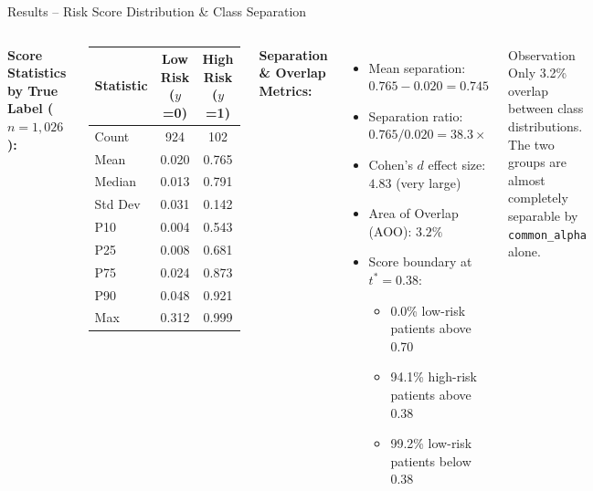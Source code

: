 \documentclass[aspectratio=169]{beamer}
\begin{document}
\begin{frame}{Results -- Risk Score Distribution \& Class Separation}
  \begin{columns}[T]
      \textbf{Score Statistics by True Label ($n=1{,}026$):}
      \begin{center}\small
      \begin{tabular}{@{}lcc@{}}
        \toprule
        \textbf{Statistic} & \textbf{Low Risk ($y$=0)}
                           & \textbf{High Risk ($y$=1)} \\
        \midrule
        Count      & 924  & 102 \\
        Mean       & 0.020 & 0.765 \\
        Median     & 0.013 & 0.791 \\
        Std Dev    & 0.031 & 0.142 \\
        P10        & 0.004 & 0.543 \\
        P25        & 0.008 & 0.681 \\
        P75        & 0.024 & 0.873 \\
        P90        & 0.048 & 0.921 \\
        Max        & 0.312 & 0.999 \\
        \bottomrule
      \end{tabular}
      \end{center}
      \textbf{Separation \& Overlap Metrics:}
      \begin{itemize}\small
        \item Mean separation: $0.765 - 0.020 = \mathbf{0.745}$
        \item Separation ratio: $0.765/0.020 = \mathbf{38.3\times}$
        \item Cohen's $d$ effect size: $\mathbf{4.83}$ (very large)
        \item Area of Overlap (AOO): $\mathbf{3.2\%}$
        \item Score boundary at $t^*{=}0.38$:
          \begin{itemize}\scriptsize
            \item 0.0\% low-risk patients above 0.70
            \item 94.1\% high-risk patients above 0.38
            \item 99.2\% low-risk patients below 0.38
          \end{itemize}
      \end{itemize}
      \begin{block}{Observation}
        Only 3.2\% overlap between class distributions.
        The two groups are almost completely separable by
        \texttt{common\_alpha} alone.
      \end{block}
  \end{columns}
\end{frame}
\end{document}
